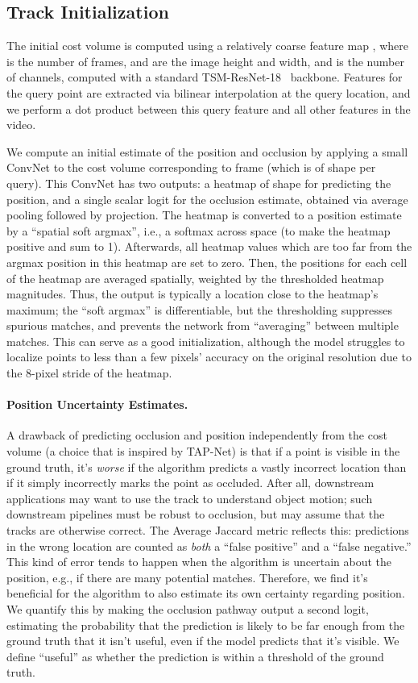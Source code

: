 \documentclass[10pt,twocolumn,letterpaper]{article}
\begin{document}
\subsection{Track Initialization}
The initial cost volume is computed using a relatively coarse  
feature map , where  is the number of frames,  and  are the image height and width, and  is the number of channels, computed with a standard TSM-ResNet-18~\cite{lin2020tsm} backbone.  
Features for the query point  are extracted via bilinear interpolation at the query location, and we perform a dot product between this query feature and all other features in the video.

We compute an initial estimate of the position  and occlusion  by applying a small ConvNet to the cost volume corresponding to frame  (which is of shape  per query).  This ConvNet has two outputs: a heatmap of shape  for predicting the position, and a single scalar logit for the occlusion estimate, obtained via average pooling followed by projection.  The heatmap is converted to a position estimate by a ``spatial soft argmax'', i.e., a softmax across space (to make the heatmap positive and sum to 1). Afterwards, all heatmap values which are too far from the argmax position in this heatmap are set to zero. Then, the positions for each cell of the heatmap are averaged spatially, weighted by the thresholded heatmap magnitudes.  Thus, the output is typically a location close to the heatmap's maximum; the ``soft argmax'' is differentiable, but the thresholding suppresses spurious matches, and prevents the network from ``averaging'' between multiple matches.  This can serve as a good initialization, although the model struggles to localize points to less than a few pixels' accuracy on the original resolution due to the 8-pixel stride of the heatmap.

\paragraph{Position Uncertainty Estimates.} A drawback of predicting occlusion and position independently from the cost volume (a choice that is inspired by TAP-Net)
is that if a point is visible in the ground truth, it's \emph{worse} if the algorithm predicts a vastly incorrect location than if it simply incorrectly marks the point as occluded.  After all, downstream applications may want to use the track to understand object motion; such downstream pipelines must be robust to occlusion, but may assume that the tracks are otherwise correct.  The Average Jaccard metric reflects this: predictions in the wrong location are counted as \emph{both} a ``false positive'' and a ``false negative.''  This kind of error tends to happen when the algorithm is uncertain about the position, e.g., if there are many potential matches.  Therefore, we find it's beneficial for the algorithm to also estimate its own certainty regarding position.  We quantify this by making the occlusion pathway output a second logit, estimating the probability  that the prediction is likely to be far enough from the ground truth that it isn't useful, even if the model predicts that it's visible.  We define ``useful'' as whether the prediction is within a threshold  of the ground truth.  
\end{document}
